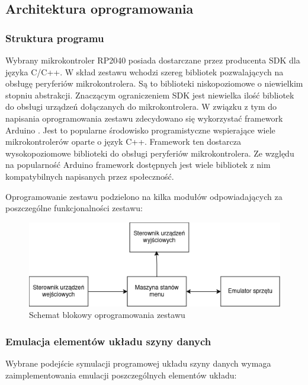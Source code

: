 \documentclass[../main.tex]{subfiles}
\begin{document}
\subsection{Architektura oprogramowania}

    \subsubsection{Struktura programu}

    Wybrany mikrokontroler RP2040 posiada dostarczane przez producenta SDK dla języka C/C++. W skład zestawu wchodzi szereg
    bibliotek pozwalających na obsługę peryferiów mikrokontrolera. Są to biblioteki niskopoziomowe o niewielkim stopniu abstrakcji.
    Znaczącym ograniczeniem SDK jest niewielka ilość bibliotek do obsługi urządzeń dołączanych do mikrokontrolera.
    W związku z tym do napisania oprogramowania zestawu zdecydowano się wykorzystać framework Arduino \cite{arduino_pico}. Jest to popularne środowisko 
    programistyczne wspierające wiele mikrokontrolerów oparte o język C++. Framework ten dostarcza wysokopoziomowe biblioteki do obsługi
    peryferiów mikrokontrolera. Ze względu na popularność Arduino framework dostępnych jest wiele bibliotek z nim kompatybilnych napisanych
    przez społeczność. 
    \par
    Oprogramowanie zestawu podzielono na kilka modułów odpowiadających za poszczególne funkcjonalności zestawu:

    \begin{figure}[H]
        \centering
        \includegraphics[width=\linewidth]{software_diagram.png}
        \caption{Schemat blokowy oprogramowania zestawu}
        \label{fig:software_diagram}
    \end{figure}

    \subsubsection{Emulacja elementów układu szyny danych}

    Wybrane podejście symulacji programowej układu szyny danych wymaga zaimplementowania emulacji poszczególnych elementów układu:
\end{document}
